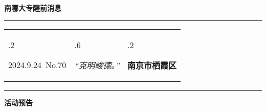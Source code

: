 \documentclass[letterpaper, 12pt]{article}
\begin{document}
\begin{center}
    \Huge\textbf{南哪大专醒前消息}
\end{center}
\vspace{4mm}
\hrule
\renewcommand\tabularxcolumn[1]{m{#1}}
\begin{tabularx}{\textwidth}{>{\hsize.2\hsize}X>{\hsize.6\hsize}X>{\hsize.2\hsize}X}
    \begin{flushleft}
        2024.9.24\, No.70
    \end{flushleft}
    &
    \begin{center}
        \textit{“克明峻德。”}
    \end{center}
    &
    \begin{flushright}
        \textbf{南京市栖霞区}
    \end{flushright}
\end{tabularx}
\vspace{-3.5mm}
\hrule
\vspace{4mm}
\centerline{\huge\textbf{活动预告}}
\end{document}
